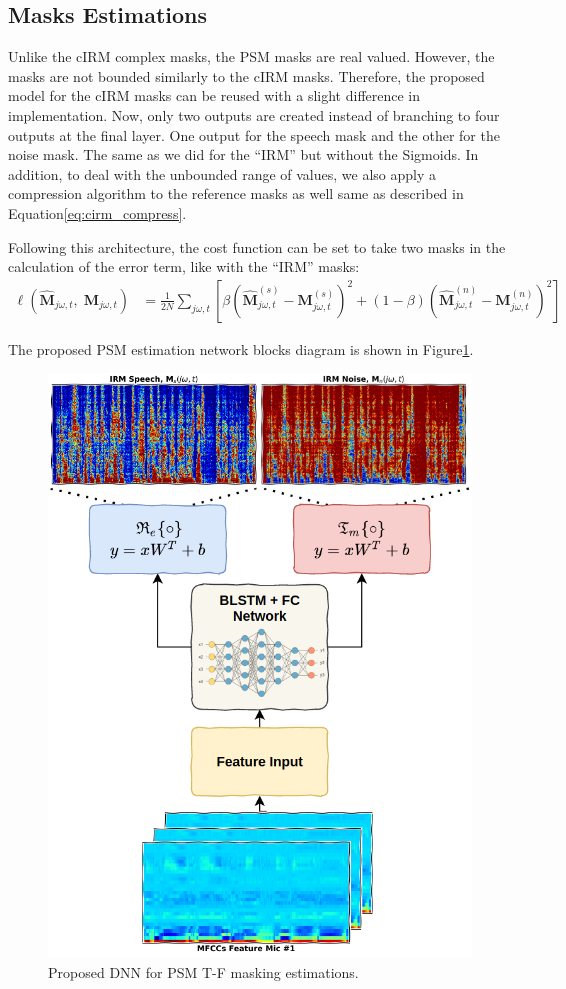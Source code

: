 \subsection{Masks Estimations}
Unlike the cIRM complex masks, the PSM masks are real valued.
However, the masks are not bounded similarly to the cIRM masks.
Therefore, the proposed model for the cIRM masks can be reused
with a slight difference in implementation. 
Now, only two outputs are created 
instead of branching to four outputs at the final layer.
One output for the speech mask and the other for the noise mask. 
The same as we did for the ``IRM'' but without the Sigmoids.
In addition, to deal with the unbounded range of values, 
we also apply a compression algorithm to the reference masks as well
same as described in Equation\;\ref{eq:cirm_compress}.

Following this architecture, the cost function can be set
to take two masks in the calculation of the error term,
like with the ``IRM'' masks:
\begin{align}\label{eq:psm_costf}
    \ell(\mathbf{\widehat{M}}_{j\omega, t},\;\mathbf{M}_{j\omega, t}) & = 
        \frac{1}{2N}\sum_{j\omega, t}
        \left[ 
            \beta\!\left( 
                \mathbf{\widehat{M}}^{(s)}_{j\omega, t} - 
                \mathbf{M}^{(s)}_{j\omega, t} 
            \right)^{2} 
            + \left( 1- \beta \right)\!
            \left(
                \mathbf{\widehat{M}}^{(n)}_{j\omega, t} - 
                \mathbf{M}^{(n)}_{j\omega, t} 
            \right)^{2} 
        \right]
\end{align}

The proposed PSM estimation network blocks diagram is shown in 
Figure\;\ref{fig:psm_nn}.

\begin{figure}[H]
    \centering
    \includegraphics[width=0.75\linewidth]{Beamformers/images/psm_nn}
    \caption{Proposed DNN for PSM T-F masking estimations.}\label{fig:psm_nn}
\end{figure}


